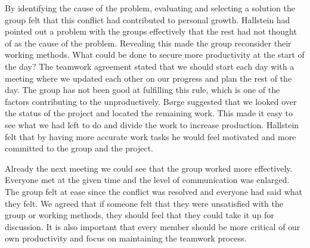 By identifying the cause of the problem, evaluating and selecting a solution the group felt that this conflict had contributed to personal growth. Hallstein had pointed out a problem with the groups effectively that the rest had not thought of as the cause of the problem. Revealing this made the group reconsider their working methods. What could be done to secure more productivity at the start of the day? The teamwork agreement stated that we should start each day with a meeting where we updated each other on our progress and plan the rest of the day. The group has not been good at fulfilling this rule, which is one of the factors contributing to the unproductively. Børge suggested that we looked over the status of the project and located the remaining work. This made it easy to see what we had left to do and divide the work to increase production. Hallstein felt that by having more accurate work tasks he would feel motivated and more committed to the group and the project.  

Already the next meeting we could see that the group worked more effectively. Everyone met at the given time and the level of communication was enlarged. The group felt at ease since the conflict was resolved and everyone had said what they felt. We agreed that if someone felt that they were unsatisfied with the group or working methods, they should feel that they could take it up for discussion. It is also important that every member should be more critical of our own productivity and focus on maintaining the teamwork process.  
